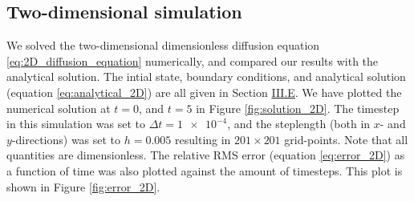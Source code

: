 \documentclass[reprint,english,notitlepage]{revtex4-1}  %
\begin{document}
\subsection{Two-dimensional simulation} \label{sec:results_2D}

We solved the two-dimensional dimensionless diffusion equation \eqref{eq:2D_diffusion_equation} numerically, and compared our results with the analytical solution. The intial state, boundary conditions, and analytical solution (equation \eqref{eq:analytical_2D}) are all given in Section \hyperref[sec:method_2D_sim]{III.E}. We have plotted the numerical solution at $t=0$, and $t=5$ in Figure \ref{fig:solution_2D}. The timestep in this simulation was set to $\Delta t = \num{1e-4}$, and the steplength (both in $x$- and $y$-directions) was set to $h = 0.005$ resulting in \(201\times 201\) grid-points. Note that all quantities are dimensionless. The relative RMS error (equation \eqref{eq:error_2D}) as a function of time was also plotted against the amount of timesteps. This plot is shown in Figure \ref{fig:error_2D}.
\end{document}
